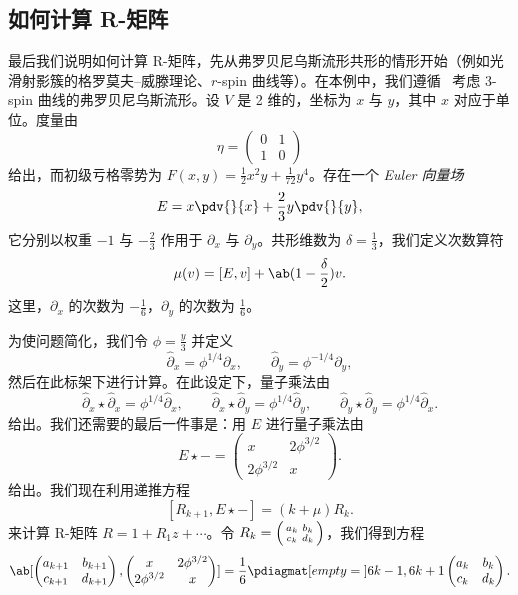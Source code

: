 \subsection{如何计算 R-矩阵}%
\label{sub:How to compute the R-matrix}

最后我们说明如何计算 R-矩阵，先从弗罗贝尼乌斯流形共形的情形开始（例如光滑射影簇的格罗莫夫–威滕理论、\(r\)-spin 曲线等）。在本例中，我们遵循~\cite{PPZ2015} 考虑 3-spin 曲线的弗罗贝尼乌斯流形。设 \(V\) 是 2 维的，坐标为 \(x\) 与 \(y\)，其中 \(x\) 对应于单位。度量由
\[ \eta = \begin{pmatrix}
    0 & 1 \\
    1 & 0
\end{pmatrix} \]
给出，而初级亏格零势为 \(F(x,y) = \frac{1}{2} x^2 y + \frac{1}{72} y^4\)。存在一个 \textit{Euler 向量场}
\[ E = x \pdv{}{x} + \frac{2}{3} y \pdv{}{y}, \]
它分别以权重 \(-1\) 与 \(-\frac{2}{3}\) 作用于 \(\partial_x\) 与 \(\partial_y\)。共形维数为 \(\delta = \frac{1}{3}\)，我们定义次数算符
\[ \mu(v) = [E,v] + \ab(1 - \frac{\delta}{2})v. \]
这里，\(\partial_x\) 的次数为 \(-\frac{1}{6}\)，\(\partial_y\) 的次数为 \(\frac{1}{6}\)。

为使问题简化，我们令 \(\phi = \frac{y}{3}\) 并定义
\[ \hat{\partial}_x = \phi^{1/4} \partial_x, \qquad \hat{\partial}_y = \phi^{-1/4} \partial_y, \]
然后在此标架下进行计算。在此设定下，量子乘法由
\[ \hat{\partial}_x \star \hat{\partial}_x = \phi^{1/4} \hat{\partial}_x, \qquad \hat{\partial}_x \star \hat{\partial}_y = \phi^{1/4} \hat{\partial}_y, \qquad \hat{\partial}_y \star \hat{\partial}_y = \phi^{1/4} \hat{\partial}_x. \]
给出。我们还需要的最后一件事是：用 \(E\) 进行量子乘法由
\[ E \star - = \begin{pmatrix}
    x & 2 \phi^{3/2} \\
    2 \phi^{3/2} & x 
\end{pmatrix}. \]
给出。我们现在利用递推方程
\[ [R_{k+1}, E \star -] = (k + \mu) R_k. \]
来计算 R-矩阵 \(R = 1 + R_1 z + \cdots\)。令 \(R_k = \begin{psmallmatrix}
    a_k & b_k \\
    c_k & d_k
\end{psmallmatrix}\)，我们得到方程
\[ \ab[
    \begin{pmatrix}
        a_{k+1} & b_{k+1} \\
        c_{k+1} & d_{k+1}
    \end{pmatrix}, \begin{pmatrix}
        x & 2 \phi^{3/2} \\
        2 \phi^{3/2} & x 
    \end{pmatrix}
] = \frac{1}{6} \pdiagmat[empty={}]{6k-1, 6k+1} \begin{pmatrix}
    a_k & b_k \\
    c_k & d_k 
\end{pmatrix}. \]


